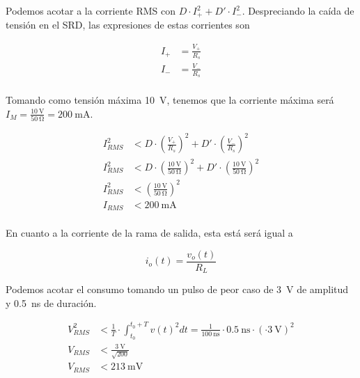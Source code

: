 Podemos acotar a la corriente RMS con $D \cdot I_+^2 + D' \cdot I_-^2$.
Despreciando la caída de tensión en el SRD, las expresiones de estas corrientes son

\begin{equation}
    \begin{aligned}
        I_+ &= \frac{V_+}{R_s} \\
        I_- &= \frac{V_-}{R_s} \\
    \end{aligned}
\end{equation}

Tomando como tensión máxima \qty{10}{\volt}, tenemos que la corriente máxima será
$I_M = \frac{ \qty{10}{\volt}}{ \qty{50}{\ohm}} = \qty{200}{\milli\ampere}$.

\begin{equation}
    \begin{aligned}
        I_{RMS}^2 &< D \cdot \left( \frac{V_+}{R_s} \right) ^2 + D' \cdot
        \left( \frac{V_-}{R_s} \right) ^2 \\
        I_{RMS}^2 &< D \cdot \left( \frac{\qty{10}{\volt}}{\qty{50}{\ohm}} \right) ^2 + D' \cdot
        \left( \frac{\qty{10}{\volt}}{\qty{50}{\ohm}} \right) ^2 \\
        I_{RMS}^2 &< \left( \frac{\qty{10}{\volt}}{\qty{50}{\ohm}} \right) ^2  \\
        I_{RMS} &< \qty{200}{\milli\ampere} \\
    \end{aligned}
\end{equation}

En cuanto a la corriente de la rama de salida, esta está será igual a

\begin{equation}
    i_o(t) = \frac{v_o(t)}{R_L}
\end{equation}

Podemos acotar el consumo tomando un pulso de peor caso de \qty{3}{\volt} de
amplitud y \qty{0.5}{\nano\second} de duración.

\begin{equation}
    \begin{aligned}
        V_{RMS}^2 &< \frac{1}{T} \cdot \int_{t_0}^{t_0+T} v(t)^2dt =
        \frac{1}{\qty{100}{\nano\second}} \cdot \qty{0.5}{\nano\second} \cdot
        \left( \cdot \qty{3}{\volt} \right )^2 \\
        V_{RMS} &< \frac{\qty{3}{\volt}}{\sqrt{200}} \\
        V_{RMS} &< \qty{213}{\milli\volt}
    \end{aligned}
\end{equation}

